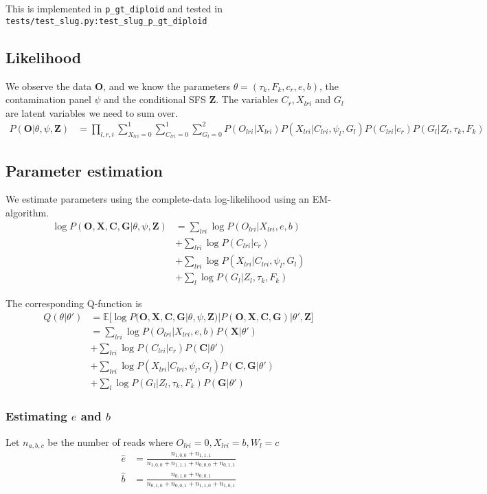 \documentclass[10pt,a4paper]{article}
\begin{document}
This is implemented in \texttt{p\_gt\_diploid} and tested in \texttt{tests/test\_slug.py:test\_slug\_p\_gt\_diploid}


\subsection*{Likelihood}
We observe the data $\mathbf{O}$, and we know the parameters $\theta = (\tau_k, F_k, c_r, e,b)$, the 
contamination panel $\psi$ and the conditional SFS $\mathbf{Z}$. The variables
$C_r, X_{lri}$ and $G_l$ are latent variables we need to sum over.
\begin{align}
P(\mathbf{O} | \theta, \psi, \mathbf{Z}) &= 
\prod_{l, r, i}\sum_{X_{lri}=0}^1\sum_{C_{lri}=0}^1\sum_{G_{l}=0}^2 P(O_{lri} |X_{lri}) P(X_{lri} | C_{lri}, \psi_l, G_l) P(C_{lri} | c_r) P(G_l | Z_l, \tau_k, F_k)
\end{align}

\subsection*{Parameter estimation}
We estimate parameters using the complete-data log-likelihood using an EM-algorithm.
\begin{align*}
\log P(\mathbf{O}, \mathbf{X}, \mathbf{C}, \mathbf{G} | \theta, \psi, \mathbf{Z}) &= 
\sum_{lri} \log P(O_{lri} | X_{lri}, e, b)\\
&+ \sum_{lri}\log P(C_{lri} | c_r)\\
&+ \sum_{lri}\log P(X_{lri} | C_{lri}, \psi_l, G_l)\\
&+ \sum_{l} \log P( G_l | Z_l, \tau_k, F_k)
\end{align*}

The corresponding Q-function is \begin{align*}
Q(\theta | \theta') &= \mathbb{E}\big[\log P(\mathbf{O}, \mathbf{X}, \mathbf{C}, \mathbf{G} | \theta, \psi, \mathbf{Z}) | P(\mathbf{O, X, C, G}) | \theta', \mathbf{Z} \big]\\ &= 
\sum_{lri} \log P(O_{lri} | X_{lri}, e, b) P(\mathbf{X} | \theta')\\
&+ \sum_{lri}\log P(C_{lri} | c_r) P(\mathbf{C} | \theta')\\
&+ \sum_{lri}\log P(X_{lri} | C_{lri}, \psi_l, G_l)P(\mathbf{C,G} | \theta')\\
&+ \sum_{l} \log P( G_l | Z_l, \tau_k, F_k) P(\mathbf{G} | \theta')
\end{align*}


\subsubsection*{Estimating $e$ and $b$}
Let $n_{a,b,c}$ be the number of reads where $O_{lri}=0, X_{lri}=b, W_l=c$
\begin{align*}
\hat{e} & = \frac{n_{1,0,0} + n_{1,1,1}}{n_{1,0,0} + n_{1,1,1} + n_{0,0,0} +n_{0, 1, 1}}\\
\hat{b} & = \frac{n_{0,1,0} + n_{0, 0,1}}{n_{0, 1, 0} + n_{0, 0, 1} + n_{1, 1, 0} +n_{1, 0, 1}}
\end{align*}
\end{document}
